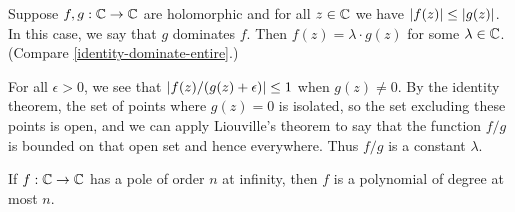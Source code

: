 \documentclass{homework}
\begin{document}
                                                                                                                              \begin{problem}\label{entire-dominate-entire}Suppose $f, g : \mathbb{C} \to \mathbb{C}$ are holomorphic and for all $z \in \mathbb{C}$ we have $\left|f(z)\right| \leq \left|g(z)\right|$.  In this case, we say that $g$ dominates $f$.  Then $f(z) = \lambda \cdot g(z)$ for some $\lambda \in \mathbb{C}$.  (Compare \ref{identity-dominate-entire}.)
                                                                                                                              \end{problem}
                                                                                                                              \begin{solution}
                                                                                                                              For all $\epsilon>0$, we see that $\left|f(z)/(g(z)+\epsilon)\right| \leq 1$ when $g(z)\neq 0$. By the identity theorem, the set of points where $g(z)=0$ is isolated, so the set excluding these points is open, and we can apply Liouville's theorem to say that the function $f/g$ is bounded on that open set and hence everywhere. Thus $f/g$ is a constant $\lambda$.
                                                                                                                              \end{solution}
                                                                                                                              \begin{problem}
                                                                                                                                If $f : \mathbb{C} \to \mathbb{C}$ has a pole of order $n$ at infinity, then $f$ is a polynomial of degree at most $n$.
                                                                                                                                \end{problem}
\end{document}
